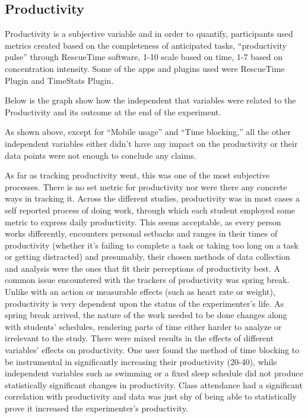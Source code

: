 \subsection{Productivity}


Productivity is a subjective variable and in order to quantify, participants used metrics created based on the completeness of anticipated tasks, “productivity pulse” through RescueTime software, 1-10 scale based on time, 1-7 based on concentration intensity. Some of the apps and plugins used were RescueTime Plugin  and TimeStats Plugin.

Below is the graph show how the independent that variables were related to the Productivity and its outcome at the end of the experiment.

As shown above, except for “Mobile usage” and “Time blocking,” all the other independent variables either didn’t have any impact on the productivity or their data points were not enough to conclude any claims.

As far as tracking productivity went, this was one of the most subjective processes.  There is no set metric for productivity nor were there any concrete ways in tracking it.  Across the different studies, productivity was in most cases a self reported process of doing work, through which each student employed some metric to express daily productivity.  This seems acceptable, as every person works differently, encounters personal setbacks and ranges in their times of productivity (whether it's failing to complete a task or taking too long on a task or getting distracted) and presumably, their chosen methods of data collection and analysis were the ones that fit their perceptions of productivity best.  A common issue encountered with the trackers of productivity was spring break.  Unlike with an action or measurable effects (such as heart rate or weight), productivity is very dependent upon the status of the experimenter’s life.  As spring break arrived, the nature of the work needed to be done changes along with students’ schedules, rendering parts of time either harder to analyze or irrelevant to the study.  There were mixed results in the effects of different variables’ effects on productivity.  One user found the method of time blocking to be instrumental in significantly increasing their productivity (20-40), while independent variables such as swimming or a fixed sleep schedule did not produce statistically significant changes in productivity.  Class attendance had a significant correlation with productivity and data was just shy of being able to statistically prove it increased the experimenter’s productivity. 

